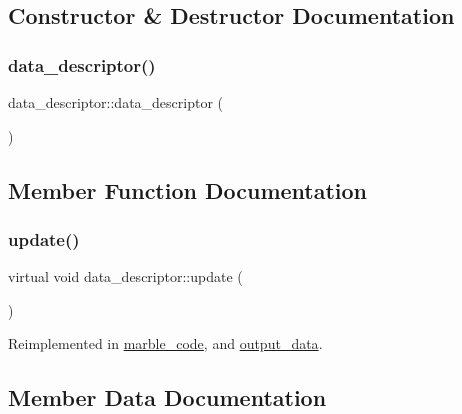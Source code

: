 \subsection{Constructor \& Destructor Documentation}
\mbox{\label{structdata__descriptor_a6d9ca56cc8c9dc991da573b4de28a24f}} 
\subsubsection{\texorpdfstring{data\+\_\+descriptor()}{data\_descriptor()}}
{\footnotesize\ttfamily data\+\_\+descriptor\+::data\+\_\+descriptor (\begin{DoxyParamCaption}{ }\end{DoxyParamCaption})}



\subsection{Member Function Documentation}
\mbox{\label{structdata__descriptor_ad6cd92beb7d2b9291e0d130a24faa380}} 
\subsubsection{\texorpdfstring{update()}{update()}}
{\footnotesize\ttfamily virtual void data\+\_\+descriptor\+::update (\begin{DoxyParamCaption}{ }\end{DoxyParamCaption})\hspace{0.3cm}{\ttfamily [virtual]}}



Reimplemented in \hyperlink{structmarble__code_ac2d593b81e3f340f11e8fe6b8978163b}{marble\+\_\+code}, and \hyperlink{structoutput__data_ad3dd0b4e74cd55dee641af403690ed64}{output\+\_\+data}.



\subsection{Member Data Documentation}
\mbox{\label{structdata__descriptor_a438b90d9b79eaa4d589d13edc66809cb}} 
